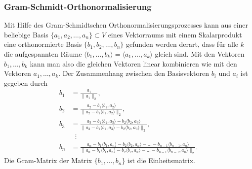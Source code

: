 \subsubsection{Gram-Schmidt-Orthonormalisierung}
Mit Hilfe des Gram-Schmidtschen Orthonormalisierungsprozesses kann aus
einer beliebige Basis $\{a_1,a_2,\dots,a_n\}\subset V$ eines Vektorraums
mit einem Skalarprodukt eine orthonormierte Basis 
$\{b_1,b_2,\dots,b_n\}$ gefunden werden derart, dass für alle $k$
die aufgespannten Räume
$\langle b_1,\dots,b_k\rangle = \langle a_1,\dots ,a_k\rangle$
gleich sind.
%
Mit den Vektoren $b_1,\dots,b_k$ kann man also die gleichen Vektoren
linear kombinieren wie mit den Vektoren $a_1,\dots,a_k$.
Der Zusammenhang zwischen den Basisvektoren $b_i$ und $a_i$ ist
gegeben durch
\begin{align*}
b_1&=\frac{a_1}{\|a_1\|_2},
\\
b_2&=\frac{a_2-b_1\langle b_1,a_2\rangle}{\|a_2-b_1\langle b_1,a_2\rangle\|_2},
\\
b_3&=\frac{a_3-b_1\langle b_1,a_3\rangle-b_2\langle b_2,a_3\rangle}{\|a_3-b_1\langle b_1,a_3\rangle-b_2\langle b_2,a_3\rangle\|_2},
\\
&\phantom{n}\vdots\\
b_n
&=
\frac{
a_n-b_1\langle b_1,a_n\rangle-b_2\langle b_2,a_n\rangle
-\dots-b_{n-1}\langle b_{n-1},a_n\rangle
}{
\|
a_n-b_1\langle b_1,a_n\rangle-b_2\langle b_2,a_n\rangle
-\dots-b_{n-1}\langle b_{n-1},a_n\rangle
\|_2
}.
\end{align*}
Die Gram-Matrix der Matrix $\{b_1,\dots,b_n\}$ ist die Einheitsmatrix.

